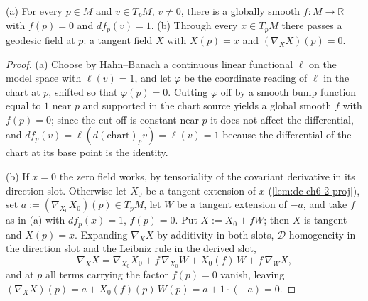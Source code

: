 \begin{lemma}
  \label{lem:dc-ch6-2-9-existence}
  \leanok
  (a) For every $p\in\overline{M}$ and $v\in T_p\overline{M}$, $v\neq0$, there is a
  globally smooth $f:\overline{M}\to\mathbb{R}$ with $f(p)=0$ and $df_p(v)=1$.
  (b) Through every $x\in T_pM$ there passes a geodesic field at $p$: a tangent
  field $X$ with $X(p)=x$ and $(\nabla_X X)(p)=0$.
\end{lemma}
\begin{proof}
  \leanok
  \sketch
  (a) Choose by Hahn--Banach a continuous linear functional $\ell$ on the model
  space with $\ell(v)=1$, and let $\varphi$ be the coordinate reading of $\ell$
  in the chart at $p$, shifted so that $\varphi(p)=0$. Cutting $\varphi$ off by
  a smooth bump function equal to $1$ near $p$ and supported in the chart source
  yields a global smooth $f$ with $f(p)=0$; since the cut-off is constant near
  $p$ it does not affect the differential, and $df_p(v)=\ell(d(\mathrm{chart})_p
  v)=\ell(v)=1$ because the differential of the chart at its base point is the
  identity.

  (b) If $x=0$ the zero field works, by tensoriality of the covariant derivative
  in its direction slot. Otherwise let $X_0$ be a tangent extension of $x$
  (\cref{lem:dc-ch6-2-proj}), set $a:=(\nabla_{X_0}X_0)(p)\in T_pM$, let $W$ be a
  tangent extension of $-a$, and take $f$ as in (a) with $df_p(x)=1$, $f(p)=0$.
  Put $X:=X_0+fW$; then $X$ is tangent and $X(p)=x$. Expanding
  $\nabla_{X}X$ by additivity in both slots, $\mathcal{D}$-homogeneity in the
  direction slot and the Leibniz rule in the derived slot,
  $$
  \nabla_X X=\nabla_{X_0}X_0+f\,\nabla_{X_0}W+X_0(f)\,W+f\,\nabla_{W}X ,
  $$
  and at $p$ all terms carrying the factor $f(p)=0$ vanish, leaving
  $(\nabla_XX)(p)=a+X_0(f)(p)\,W(p)=a+1\cdot(-a)=0$.
\end{proof}


